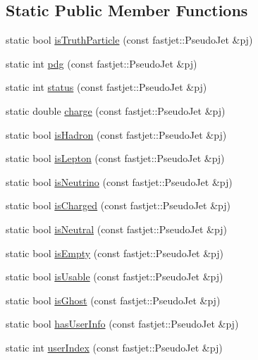 \subsection*{Static Public Member Functions}
\begin{DoxyCompactItemize}
\item 
static bool \hyperlink{classAnalysis_1_1FastJet_1_1TruthInfo_a62a082245c4c8d8d370c7087de193dd4}{is\+Truth\+Particle} (const fastjet\+::\+Pseudo\+Jet \&pj)
\item 
static int \hyperlink{classAnalysis_1_1FastJet_1_1TruthInfo_ae1c07a279249c17a4d23c332291db118}{pdg} (const fastjet\+::\+Pseudo\+Jet \&pj)
\item 
static int \hyperlink{classAnalysis_1_1FastJet_1_1TruthInfo_ac12a01abd7648c60dd46f555c9c1a80d}{status} (const fastjet\+::\+Pseudo\+Jet \&pj)
\item 
static double \hyperlink{classAnalysis_1_1FastJet_1_1TruthInfo_af2cae2b143b988d8df611b0b66c744e2}{charge} (const fastjet\+::\+Pseudo\+Jet \&pj)
\item 
static bool \hyperlink{classAnalysis_1_1FastJet_1_1TruthInfo_a4444f96f6c8fe5ff215cff9d9ca34415}{is\+Hadron} (const fastjet\+::\+Pseudo\+Jet \&pj)
\item 
static bool \hyperlink{classAnalysis_1_1FastJet_1_1TruthInfo_a872fd6a63380813b5cbfac09372c3057}{is\+Lepton} (const fastjet\+::\+Pseudo\+Jet \&pj)
\item 
static bool \hyperlink{classAnalysis_1_1FastJet_1_1TruthInfo_a223902efb31a681c06d507ff6971c95b}{is\+Neutrino} (const fastjet\+::\+Pseudo\+Jet \&pj)
\item 
static bool \hyperlink{classAnalysis_1_1FastJet_1_1TruthInfo_a0c53d9c724ca822ec93efa84fcfbbafd}{is\+Charged} (const fastjet\+::\+Pseudo\+Jet \&pj)
\item 
static bool \hyperlink{classAnalysis_1_1FastJet_1_1TruthInfo_a41b32998acd985a82b5da1928b9723b7}{is\+Neutral} (const fastjet\+::\+Pseudo\+Jet \&pj)
\item 
static bool \hyperlink{classAnalysis_1_1FastJet_1_1UserInfo_a79ba59c5af9a4bc2e641ab2e54e8d50b}{is\+Empty} (const fastjet\+::\+Pseudo\+Jet \&pj)
\item 
static bool \hyperlink{classAnalysis_1_1FastJet_1_1UserInfo_a18b23aae344587ff280a046e70af1d29}{is\+Usable} (const fastjet\+::\+Pseudo\+Jet \&pj)
\item 
static bool \hyperlink{classAnalysis_1_1FastJet_1_1UserInfo_a4682fdc7e258328293b05951f55cc7a1}{is\+Ghost} (const fastjet\+::\+Pseudo\+Jet \&pj)
\item 
static bool \hyperlink{classAnalysis_1_1FastJet_1_1UserInfo_a681f1076b15320ea55e7104b4fe01c3a}{has\+User\+Info} (const fastjet\+::\+Pseudo\+Jet \&pj)
\item 
static int \hyperlink{classAnalysis_1_1FastJet_1_1UserInfo_a767f93f891d045f209198cdf72fddf36}{user\+Index} (const fastjet\+::\+Pseudo\+Jet \&pj)
\end{DoxyCompactItemize}
